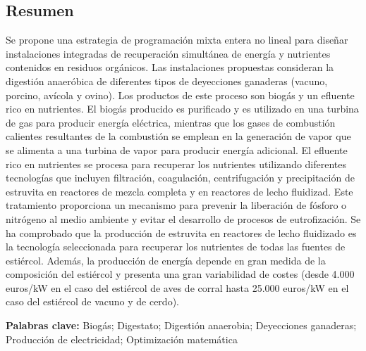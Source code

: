 \begin{refsection}[referencesCh2]
\section*{Resumen}
Se propone una estrategia de programación mixta entera no lineal para diseñar instalaciones integradas de recuperación simultánea de energía y nutrientes contenidos en residuos orgánicos. Las instalaciones propuestas consideran la digestión anaeróbica de diferentes tipos de deyecciones ganaderas (vacuno, porcino, avícola y ovino). Los productos de este proceso son biogás y un efluente rico en nutrientes. El biogás producido es purificado y es utilizado en una turbina de gas para producir energía eléctrica, mientras que los gases de combustión calientes resultantes de la combustión se emplean en la generación de vapor que se alimenta a una turbina de vapor para producir energía adicional. El efluente rico en nutrientes se procesa para recuperar los nutrientes utilizando diferentes tecnologías que incluyen filtración, coagulación, centrifugación y precipitación de estruvita en reactores de mezcla completa y en reactores de lecho fluidizad. Este tratamiento proporciona un mecanismo para prevenir la liberación de fósforo o nitrógeno al medio ambiente y evitar el desarrollo de procesos de eutrofización. Se ha comprobado que la producción de estruvita en reactores de lecho fluidizado es la tecnología seleccionada para recuperar los nutrientes de todas las fuentes de estiércol. Además, la producción de energía depende en gran medida de la composición del estiércol y presenta una gran variabilidad de costes (desde 4.000 euros/kW en el caso del estiércol de aves de corral hasta 25.000 euros/kW en el caso del estiércol de vacuno y de cerdo).

\bigskip
\textbf{Palabras clave:} Biogás; Digestato; Digestión anaerobia; Deyecciones ganaderas; Producción de electricidad; Optimización matemática


\newpage


\end{refsection}
